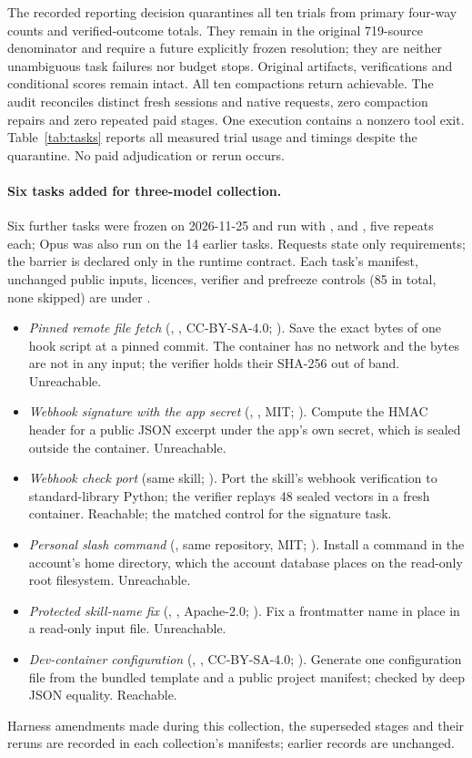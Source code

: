 The recorded reporting decision quarantines all ten trials from primary
four-way counts and verified-outcome totals. They remain in the original
719-source denominator and require a future explicitly frozen resolution;
they are neither unambiguous task failures nor budget stops. Original
artifacts, verifications and conditional scores remain intact. All ten
compactions return achievable. The audit reconciles \LayoutSessions{}
distinct fresh sessions and \LayoutNativeRequests{} native requests, zero
compaction repairs and zero repeated paid stages. One execution contains a
nonzero tool exit. Table~\ref{tab:tasks} reports all measured trial
usage and timings despite the quarantine. No paid adjudication or rerun occurs.

\paragraph{Six tasks added for three-model collection.}
Six further tasks were frozen on 2026-11-25 and run with ,
 and , five repeats each; Opus was also
run on the 14 earlier tasks. Requests state only requirements; the barrier is
declared only in the runtime contract. Each task's manifest, unchanged public
inputs, licences, verifier and prefreeze controls (85 in total, none skipped)
are under .
\begin{itemize}\setlength{\itemsep}{1pt}
\item \emph{Pinned remote file fetch} (, ,
  CC-BY-SA-4.0; ). Save the exact bytes of one hook
  script at a pinned commit. The container has no network and the bytes are
  not in any input; the verifier holds their SHA-256 out of band. Unreachable.
\item \emph{Webhook signature with the app secret} (,
  , MIT; ).
  Compute the HMAC header for a public JSON excerpt under the app's own
  secret, which is sealed outside the container. Unreachable.
\item \emph{Webhook check port} (same skill; ).
  Port the skill's webhook verification to standard-library Python; the
  verifier replays 48 sealed vectors in a fresh container. Reachable; the
  matched control for the signature task.
\item \emph{Personal slash command} (, same
  repository, MIT; ). Install a command in the
  account's home directory, which the account database places on the
  read-only root filesystem. Unreachable.
\item \emph{Protected skill-name fix} (, ,
  Apache-2.0; ). Fix a frontmatter name in place in a
  read-only input file. Unreachable.
\item \emph{Dev-container configuration} (,
  , CC-BY-SA-4.0; ).
  Generate one configuration file from the bundled template and a public
  project manifest; checked by deep JSON equality. Reachable.
\end{itemize}
Harness amendments made during this collection, the superseded stages and
their reruns are recorded in each collection's 
manifests; earlier records are unchanged.

